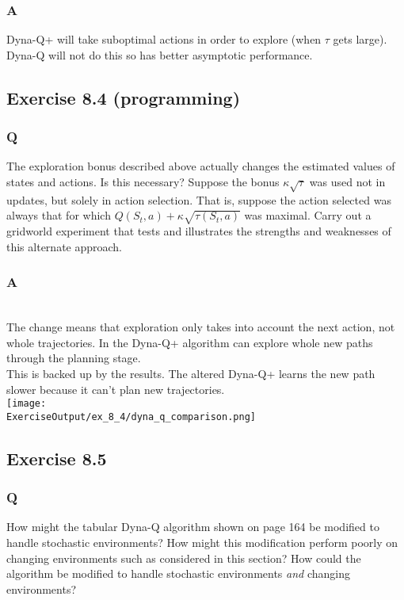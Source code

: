 \subsubsection*{A}
Dyna-Q+ will take suboptimal actions in order to explore (when $\tau$ gets large). Dyna-Q will not do this so has better asymptotic performance.

\subsection{Exercise 8.4 (programming)}
\subsubsection*{Q}
The exploration bonus described above actually changes the estimated values of states and actions. Is this necessary? Suppose the bonus $\kappa \sqrt{\tau}$ was used not in updates, but solely in action selection. That is, suppose the action selected was always that for which $Q(S_t, a) + \kappa \sqrt{\tau(S_t, a)}$ was maximal. Carry out a gridworld experiment that tests and illustrates the strengths and weaknesses of this alternate approach.

\subsubsection*{A}
\ProgrammingExercise{}\\

The change means that exploration only takes into account the next action, not whole trajectories. In the Dyna-Q+ algorithm can explore whole new paths through the planning stage.\\

This is backed up by the results. The altered Dyna-Q+ learns the new path slower because it can't plan new trajectories.
\\
\texttt{[image: \\ExerciseOutput/ex\_8\_4/dyna\_q\_comparison.png]}

\subsection{Exercise 8.5}
\subsubsection*{Q}
How might the tabular Dyna-Q algorithm shown on page 164 be modified to handle stochastic environments? How might this modification perform poorly on changing environments such as considered in this section? How could the algorithm be modified to handle stochastic environments \emph{and} changing environments?

